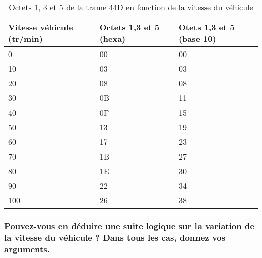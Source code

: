 \documentclass{rapportECC}
\begin{document}
\begin{table}[H]
    \begin{tabular}{|l|l|l|}
    \hline
    \textbf{Vitesse véhicule (tr/min)} & \textbf{Octets 1,3 et 5 (hexa)} & \textbf{Otets 1,3 et 5  (base 10)} \\ \hline
    0                                  & 00                                       & 00                                          \\ \hline
    10                                 & 03                                       & 03                                          \\ \hline
    20                                 & 08                                       & 08                                          \\ \hline
    30                                 & 0B                                       & 11                                          \\ \hline
    40                                 & 0F                                       & 15                                         \\ \hline   
    50                                 & 13                                       & 19                                         \\ \hline
    60                                 & 17                                       & 23                                         \\ \hline
    70                                 & 1B                                       & 27                                         \\ \hline
    80                                 & 1E                                       & 30                                         \\ \hline
    90                                 & 22                                       & 34                                         \\ \hline  
    100                                & 26                                       & 38                                         \\ \hline
    \end{tabular}
    \caption{Octets 1, 3 et 5 de la trame 44D en fonction de la vitesse du véhicule}
    \label{tab:vitesse véhicule trame 44D}
\end{table}

\subsubsection*{Pouvez-vous en déduire une suite logique sur la variation de la vitesse du véhicule ? Dans tous les cas, donnez vos arguments.}
\end{document}

